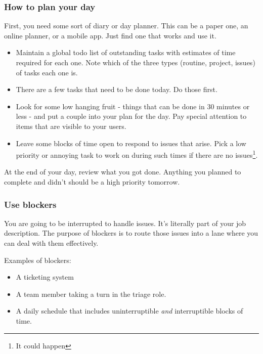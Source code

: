 \documentclass[10pt]{beamer}
\begin{document}
\begin{frame}
  \frametitle{How to plan your day}
  
  First, you need some sort of diary or day planner. This can be a paper one,
  an online planner, or a mobile app. Just find one that works and use it.
  
  \begin{itemize}
    \item Maintain a global todo list of outstanding tasks with estimates of time required for each one. 
    Note which of the three types (routine, project, issues) of tasks each one is.
    \item There are a few tasks that need to be done today. Do those first.
    \item Look for some low hanging fruit - things that can be done in 30 minutes or less - and
    put a couple into your plan for the day. Pay special attention to items that are
    visible to your users. 
    \item Leave some blocks of time open to respond to issues that arise. Pick a low priority or
    annoying task to work on during such times if there are no issues\footnote{It could happen}.
  \end{itemize}
  
  At the end of your day, review what you got done. Anything you planned to complete and
  didn't should be a high priority tomorrow.
     
\end{frame}

\begin{frame}
  \frametitle{Use blockers}
  
  You are going to be interrupted to handle issues. It's literally part of
  your job description. The purpose of blockers is to route those issues into
  a lane where you can deal with them effectively.
  
  Examples of blockers:
  
  \begin{itemize}
    \item A ticketing system
    \item A team member taking a turn in the triage role.
    \item A daily schedule that includes uninterruptible \emph{and} 
    interruptible blocks of time.
  \end{itemize}
     
\end{frame}
\end{document}
